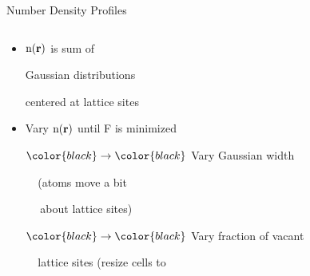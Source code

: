 \documentclass{beamer}
\renewcommand{\vec}[1]{\mathbf{#1}}
\begin{document}
\begin{frame}{Number Density Profiles}
	\begin{columns}[t]
	    \vspace{-2.5em}
        \begin{block}{}
            \begin{itemize}
            \item $\text n(\vec{r})$ is sum of 
            
            Gaussian distributions  
            
            centered at lattice sites
            \item Vary $\text n(\vec{r})$ until F is minimized
				\vspace{-0.5em}
				
				$\color{black}\rightarrow\color{black}$ Vary Gaussian width	
							
				$~~~~~$\small (atoms move a bit
				
				$~~~~~~$about lattice sites) %
				\normalsize
			   \vspace{0.5em}
			   
				$\color{black}\rightarrow\color{black}$ Vary fraction of vacant
				
				$~~~~~$lattice sites \small (resize cells to
            

\end{itemize}
\end{block}
\end{columns}
\end{frame}
\end{document}
